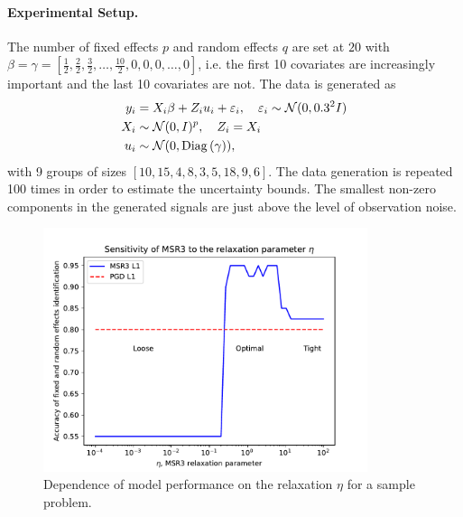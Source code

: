 


\paragraph{Experimental Setup.} The number of fixed effects $p$ and random effects $q$ are set at $20$ with $\beta = \gamma = [\frac{1}{2}, \frac{2}{2}, \frac{3}{2}, \dots, \frac{10}{2}, 0, 0, 0, \dots, 0]$, i.e. the first 10 covariates are increasingly important and the last 10 covariates are not. The data is generated as 
\[
\begin{aligned}
y_i &= X_i\beta + Z_iu_i + \varepsilon_i, \quad  \varepsilon_i \sim \operatorname{\mathcal{N}}(0, 0.3^2 I) \\
X_i &\sim \operatorname{\mathcal{N}}(0, I)^p, \quad Z_i = X_i \\ 
u_i& \sim \operatorname{\mathcal{N}}(0, \mathrm{Diag}\left(\gamma\right)),\\ 
\end{aligned}
\]
with 9 groups of sizes $[10, 15, 4, 8, 3, 5, 18, 9, 6]$. 
The data generation is repeated 100 times in order to estimate
the uncertainty bounds. The smallest non-zero components in the generated signals are just above the level of observation noise. 

\begin{figure}
\center
		\includegraphics[width=9.5cm]{figures/eta_L1.pdf}
		\caption{Dependence of model performance on the relaxation $\eta$ for a sample problem.}\label{fig:eta}
\end{figure}
	


